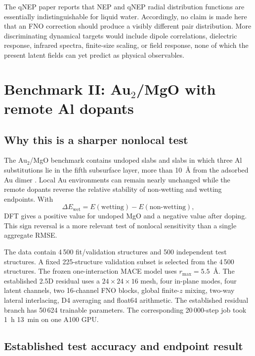\documentclass[11pt]{article}
\newcommand{\angstrom}{\ensuremath{\text{\AA}}}
\begin{document}
The qNEP paper reports that NEP and qNEP radial distribution functions are
essentially indistinguishable for liquid water. Accordingly, no claim is made
here that an FNO correction should produce a visibly different pair
distribution. More discriminating dynamical targets would include dipole
correlations, dielectric response, infrared spectra, finite-size scaling, or
field response, none of which the present latent fields can yet predict as
physical observables.

\section{\texorpdfstring{Benchmark II: Au$_2$/MgO with remote Al dopants}{Benchmark II: Au2/MgO with remote Al dopants}}
\label{sec:aumgo}

\subsection{Why this is a sharper nonlocal test}

The Au$_2$/MgO benchmark contains undoped slabs and slabs in which three Al
substitutions lie in the fifth subsurface layer, more than 10~\angstrom{} from
the adsorbed Au dimer \citep{king2025charges,kim2025universal}. Local Au environments can
remain nearly unchanged while the remote dopants reverse the relative
stability of non-wetting and wetting endpoints. With
\begin{equation}
 \Delta E_{\mathrm{wet}}=
 E(\mathrm{wetting})-E(\mathrm{non\mbox{-}wetting}),
\end{equation}
DFT gives a positive value for undoped MgO and a negative value after doping.
This sign reversal is a more relevant test of nonlocal sensitivity than a
single aggregate RMSE.

The data contain 4\,500 fit/validation structures and 500 independent test
structures. A fixed 225-structure validation subset is selected from the
4\,500 structures. The frozen one-interaction MACE model uses
\(r_{\max}=5.5\)~\angstrom. The established 2.5D residual uses a
\(24\times24\times16\) mesh, four in-plane modes, four latent channels,
two 16-channel FNO blocks, global finite-\(z\) mixing, two-way lateral
interlacing, D4 averaging and float64 arithmetic. The established residual
branch has 50\,624 trainable parameters.
The corresponding 20\,000-step job took 1~h 13~min on one A100 GPU.


\subsection{Established test accuracy and endpoint result}
\end{document}
